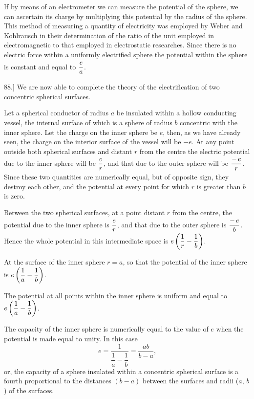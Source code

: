 \documentclass[12pt,oneside]{book}[2021/10/04]
\newcommand{\Runhead}[1]{\fancyhead[C]{\iffloatpage{}{\small#1}}}
\newcommand{\article}[1]{\phantomsection \label{art:#1}{#1.]}}
\newcommand{\xp}{\rule[-2.0ex]{0pt}{5.2ex}}
\newcommand{\¬}{\hphantom{0}}
\begin{document}
If by means of an electrometer we can measure the potential of
the sphere, we can ascertain its charge by multiplying this potential
by the radius of the sphere. This method of measuring a quantity
of electricity was employed by Weber and Kohlrausch in their
determination of the ratio of the unit employed in electromagnetic
to that employed in electrostatic researches. Since there is no
electric force within a uniformly electrified sphere the potential
within the sphere is constant and equal to \(\xp\dfrac{e}{a}\).

\article{88} We are now able to complete the theory of the electrification
of two concentric spherical surfaces.
\Runhead{CAPACITY OF TWO CONCENTRIC SPHERES.}

Let a spherical conductor of radius \(a\) be insulated within a
hollow conducting vessel, the internal surface of which is a sphere
of radius \(b\) concentric with the inner sphere. Let the charge
on the inner sphere be \(e\), then, as we have already seen, the
charge on the interior surface of the vessel will be \(-e\). At any
point outside both spherical surfaces and distant \(r\) from the
centre the electric potential due to the inner sphere will be
\(\xp\dfrac{e}{r}\), and that due to the outer sphere will be \(\xp\dfrac{-\,e}{r}\). Since these
two quantities are numerically equal, but of opposite sign, they
destroy each other, and the potential at every point for which \(r\)
is greater than \(b\) is zero.

Between the two spherical surfaces, at a point distant \(r\) from the
centre, the potential due to the inner sphere is \(\xp\dfrac{e}{r}\), and that due to
the outer sphere is \(\xp\dfrac{-\,e}{b}\). Hence the whole potential in this intermediate
space is \(e\xp\left(\dfrac{1}{r} - \dfrac{1}{b} \right)\).

At the surface of the inner sphere \(r = a\), so that the potential of
the inner sphere is \(e\xp\left(\dfrac{1}{a} - \dfrac{1}{b} \right)\).

The potential at all points within the inner sphere is uniform and
equal to \(e\xp\left(\dfrac{1}{a} - \dfrac{1}{b} \right)\).

The capacity of the inner sphere is numerically equal to the value
of \(e\) when the potential is made equal to unity. In this case
\[
e = \frac{1}{\dfrac{1}{a} - \dfrac{1}{b}} = \frac{ab}{b - a}\text{,}
\]
or, the capacity of a sphere insulated within a concentric spherical
surface is a fourth proportional to the distances \((b - a)\) between the
surfaces and radii (\(a\), \(b\)) of the surfaces.
\end{document}
